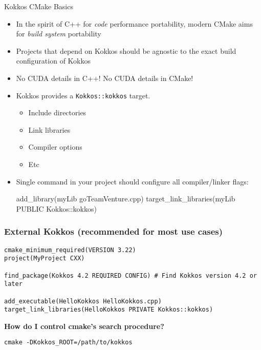 \begin{frame}[fragile]{Kokkos CMake Basics}
\begin{itemize}
\item In the spirit of C++ for \emph{code} performance portability, modern CMake aims for \emph{build system} portability
\item Projects that depend on Kokkos should be agnostic to the exact build configuration of Kokkos
\item No CUDA details in C++! No CUDA details in CMake!
\item Kokkos provides a \texttt{Kokkos::kokkos} target.
  \begin{itemize}
  \item Include directories
  \item Link libraries
  \item Compiler options
  \item Etc
  \end{itemize}
 
\item Single command in your project should configure all compiler/linker flags:

\begin{shell}
add_library(myLib goTeamVenture.cpp)
target_link_libraries(myLib PUBLIC Kokkos::kokkos)
\end{shell}
\end{itemize}
\end{frame}

\begin{frame}[fragile]
\frametitle{External Kokkos (recommended for most use cases)}

\begin{verbatim}
cmake_minimum_required(VERSION 3.22)
project(MyProject CXX)

find_package(Kokkos 4.2 REQUIRED CONFIG) # Find Kokkos version 4.2 or later

add_executable(HelloKokkos HelloKokkos.cpp)
target_link_libraries(HelloKokkos PRIVATE Kokkos::kokkos)
\end{verbatim}

\vspace{2eM}
\textbf{How do I control cmake's search procedure?}

\vspace{1eM}
\begin{verbatim}
cmake -DKokkos_ROOT=/path/to/kokkos
\end{verbatim}
\end{frame}

